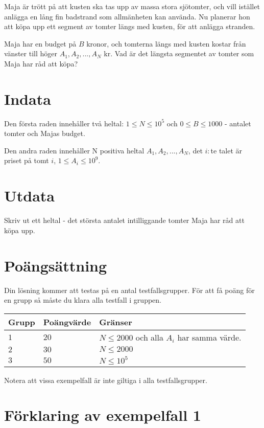 Maja är trött på att kusten ska tas upp av massa stora sjötomter, och vill istället anlägga en lång fin badstrand som allmänheten kan använda.
Nu planerar hon att köpa upp ett segment av tomter längs med kusten, för att anlägga stranden.

Maja har en budget på $B$ kronor, och tomterna längs med kusten kostar från vänster till höger $A_1,A_2,...,A_N$ kr.
Vad är det längsta segmentet av tomter som Maja har råd att köpa?

\section*{Indata}
Den första raden innehåller två heltal: $1\leq N \leq 10^5$ och $0 \leq B \leq 1000$ - antalet tomter och Majas budget.

Den andra raden innehåller N positiva heltal $A_1,A_2,...,A_N$, det $i:$te talet är priset på tomt $i$, $1\le A_i \le 10^9$.


\section*{Utdata}
Skriv ut ett heltal - det största antalet intilliggande tomter Maja har råd att köpa upp.

\section*{Poängsättning}
Din lösning kommer att testas på en antal testfallsgrupper.
För att få poäng för en grupp så måste du klara alla testfall i gruppen.

\noindent
\begin{tabular}{| l | l | p{12cm} |}
  \hline
  Grupp & Poängvärde & Gränser \\ \hline
  $1$   & $20$       & $N \leq 2000 $ och alla $A_i$ har samma värde.\\ \hline
  $2$   & $30$       & $N \leq 2000 $\\ \hline
  $3$   & $50$       & $N \leq 10^5 $  \\ \hline
\end{tabular}

Notera att vissa exempelfall är inte giltiga i alla testfallsgrupper.

\section*{Förklaring av exempelfall 1}
